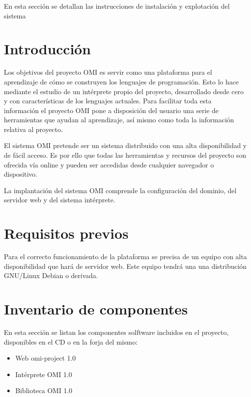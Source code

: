 

En esta sección se detallan las instrucciones de instalación y explotación del sistema

\section{Introducción}
Los objetivos del proyecto OMI es servir como una plataforma para el aprendizaje de cómo se 
construyen los lenguajes de programación. Esto lo hace mediante el estudio de un intérprete propio del 
proyecto, desarrollado desde cero y con características de los lenguajes actuales. Para facilitar toda esta información el
proyecto OMI pone a disposición del usuario una serie de herramientas que ayudan al aprendizaje, así mismo como toda la información relativa al proyecto. 

El sistema OMI pretende ser un sistema distribuido con una alta disponibilidad y de fácil acceso. Es por ello que 
todas las herramientas y recursos del proyecto son ofrecida vía online y pueden ser accedidas desde cualquier navegador o dispositivo.

La implantación del sistema OMI comprende la configuración del dominio, del servidor web y del sistema intérprete.
 
\section{Requisitos previos}
Para el correcto funcionamiento de la plataforma se precisa de un equipo con alta disponibilidad que hará de servidor web. Este equipo tendrá una 
una distribución GNU/Linux Debian o derivada.

\section{Inventario de componentes}
En esta sección se listan los componentes solftware incluidos en el proyecto, disponibles en el CD o en la forja del mismo:

\begin{itemize}
\item Web omi-project 1.0
\item Intérprete OMI 1.0
\item Biblioteca OMI 1.0
\end{itemize} 



